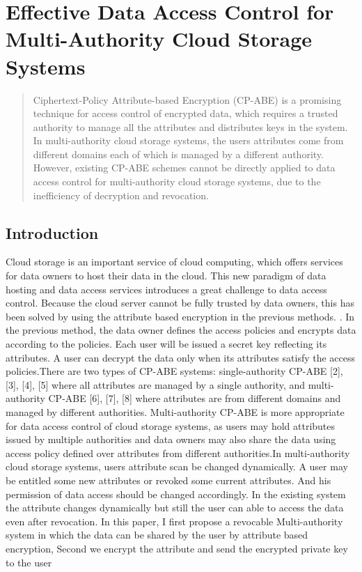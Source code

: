 \documentclass[11pt,a4paper]{report}
\begin{document}
\chapter{Effective Data Access Control for Multi-Authority Cloud Storage Systems}
\begin{abstract}
Ciphertext-Policy Attribute-based Encryption (CP-ABE) is a promising
technique for access control of encrypted data, which requires a trusted authority to
manage all the attributes and distributes keys in the system. In multi-authority cloud
storage systems, the users attributes come from different domains each of which
is managed by a different authority. However, existing CP-ABE schemes cannot be
directly applied to data access control for multi-authority cloud storage systems, due
to the inefficiency of decryption and revocation. 
\end{abstract}

\section{Introduction}

Cloud  storage  is  an  important  service  of cloud  computing,  which  offers  services  for  data owners  to  host their  data  in  the  cloud.  This  new paradigm  of  data  hosting  and  data  access  services introduces a great challenge to data access control. Because the cloud server cannot be fully trusted by data  owners,  this  has been  solved  by  using  the attribute  based  encryption  in  the  previous  methods. \newline \newline 
[1]. In the previous method, the data owner defines the  access  policies  and  encrypts  data  according  to the  policies.  Each  user  will  be  issued  a  secret  key reflecting its attributes. A user can decrypt the data only    when    its    attributes    satisfy    the    access policies.There  are  two  types  of  CP-ABE  systems: single-authority CP-ABE [2], [3], [4], [5] where all attributes  are  managed  by  a  single  authority,  and multi-authority  CP-ABE   [6],    [7],    [8]    where attributes  are  from  different  domains and managed by different authorities. Multi-authority CP-ABE is more  appropriate  for  data  access  control  of  cloud storage systems, as users may hold attributes issued by  multiple  authorities  and  data  owners  may  also share  the  data  using  access  policy defined  over attributes from different authorities.In  multi-authority  cloud  storage  systems,  users attribute scan be changed dynamically. A user may be  entitled  some  new  attributes  or  revoked  some current  attributes.   And   his   permission   of   data access   should   be   changed   accordingly.  \newline \newline In   the existing  system the  attribute  changes  dynamically but  still  the  user  can  able  to  access  the  data  even after revocation. In  this  paper,  I  first  propose  a  revocable  Multi-authority system in which the data can be shared by the  user  by attribute  based  encryption,  Second  we encrypt the attribute and send the encrypted private key to the user
\end{document}
